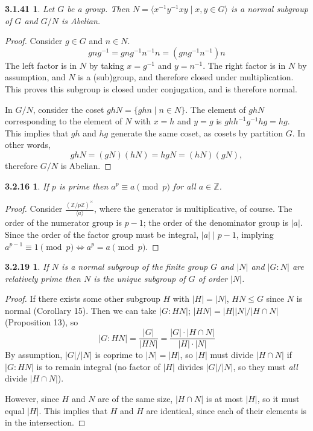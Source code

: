 \documentclass{article}
\newtheorem*{3.1.41}{3.1.41}
\newtheorem*{3.2.16}{3.2.16}
\newtheorem*{3.2.19}{3.2.19}
\begin{document}
\begin{3.1.41}
  Let $G$ be a group.
  Then $N = \langle x^{-1}y^{-1}xy \mid x, y \in G \rangle$ is a normal subgroup of $G$ and $G / N$ is Abelian.
\end{3.1.41}

\begin{proof}
  Consider $g \in G$ and $n \in N$.
  \[
    gng^{-1} = gng^{-1}n^{-1}n = (gng^{-1}n^{-1})n
  \]
  The left factor is in $N$ by taking $x = g^{-1}$ and $y = n^{-1}$.
  The right factor is in $N$ by assumption, and $N$ is a (sub)group, and therefore closed under multiplication.
  This proves this subgroup is closed under conjugation, and is therefore normal.

  In $G / N$, consider the coset $ghN = \{ghn \mid n \in N \}$.
  The element of $ghN$ corresponding to the element of $N$ with $x = h$ and $y = g$ is $ghh^{-1}g^{-1}hg = hg$.
  This implies that $gh$ and $hg$ generate the same coset, as cosets by partition $G$.
  In other words,
  \[
    ghN = (gN)(hN) = hgN = (hN)(gN),
  \]
  therefore $G / N$ is Abelian.
\end{proof}

\begin{3.2.16}
  If $p$ is prime then $a^{p} \equiv a\pmod{p}$ for all $a\in\mathbb{Z}$.
\end{3.2.16}

\begin{proof}
  Consider $\frac{(\mathbb{Z} / p\mathbb{Z})^{\times}}{\langle a \rangle}$, where the generator is multiplicative, of course.
  The order of the numerator group is $p-1$; the order of the denominator group is $|a|$.
  Since the order of the factor group must be integral, $|a| \mid p-1$, implying $a^{p-1} \equiv 1 \pmod p \Leftrightarrow a^{p} = a \pmod p$.
\end{proof}

\begin{3.2.19}
  If $N$ is a normal subgroup of the finite group $G$ and $|N|$ and $|G : N|$ are relatively prime
  then $N$ is the unique subgroup of $G$ of order $|N|$.
\end{3.2.19}

\begin{proof}

  If there exists some other subgroup $H$ with $|H| = |N|$, $HN \leq G$ since $N$ is normal (Corollary 15).
  Then we can take $|G : HN|$; $|HN| = |H||N| / |H \cap N|$ (Proposition 13), so
  \[
    |G : HN| = \frac{|G|}{|HN|} = \frac{|G| \cdot |H \cap N|}{|H| \cdot|N|}
  \]
  By assumption, $|G| / |N|$ is coprime to $|N| = |H|$, so $|H|$ must divide $|H \cap N|$ if $|G : HN|$ is to remain integral
  (no factor of $|H|$ divides $|G| / |N|$, so they must \textit{all} divide $|H \cap N|$).

  However, since $H$ and $N$ are of the same size, $|H \cap N|$ is at most $|H|$, so it must equal $|H|$.
  This implies that $H$ and $H$ are identical, since each of their elements is in the intersection.
\end{proof}
\end{document}
